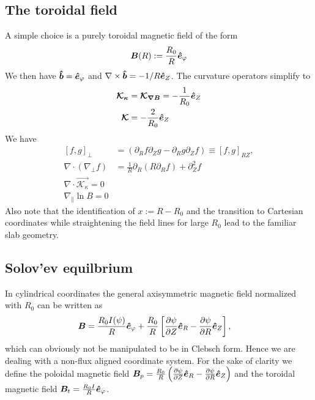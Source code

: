 \subsection{The toroidal field}\label{sec:toroidal}
A simple choice is a purely toroidal magnetic field of the form %
\begin{align}
  {\boldsymbol{B}}(R) := \frac{R_0}{R} \bm{\hat{e}}_\varphi
  \label{}
\end{align}
We then have $\bm{\hat{b}} = \bm{\hat{e}}_\varphi$ and $\nabla\times\bm{\hat{b}} = -1/R\bm{\hat{e}}_Z$. The curvature operators simplify to
\begin{align}
  {\boldsymbol{ \mathcal K_\kappa}} &= {\boldsymbol{ \mathcal K_{\nabla B}}} = -\frac{1}{R_0} \bm{\hat{e}}_Z \\
{\boldsymbol{ \mathcal K}} &= -\frac{2}{R_0}\bm{\hat{e}}_Z
  \label{}
\end{align}
We have
\begin{subequations}
\begin{align}
    [f, g]_\perp &= (\partial_R f\partial_Z g - \partial_R g\partial_Z f) \equiv [f, g]_{RZ}, \\
    \nabla \cdot(\nabla_\perp f) &= \frac{1}{R}\partial_R\left(R\partial_R f\right) + \partial_Z^2f \\
    \nabla\cdot\vec{\mathcal K_{\kappa}}= 0\\
    \nabla_\parallel \ln B = 0
    \label{}
\end{align}
\end{subequations}
Also note that the identification of $x:=R-R_0$ and the transition to
Cartesian coordinates while straightening the field lines for large $R_0$
lead to the familiar slab geometry.

\subsection{Solov'ev equilbrium}\label{sec:solovev}
In cylindrical coordinates the general axisymmetric magnetic field normalized with $R_0$ can be written as
\begin{align}
 {\boldsymbol{B}} &= \frac{R_0I(\psi)}{R} \bm{\hat{e}}_{\varphi} + \frac{R_0}{R}\left[\frac{\partial \psi}{\partial Z} \bm{\hat{e}}_R 
         -  \frac{\partial \psi}{\partial R} \bm{\hat{e}}_Z\right] ,
\end{align}
which can obviously not be manipulated to be in Clebsch form. Hence we are dealing with a non-flux aligned coordinate system.
For the sake of clarity we define the poloidal magnetic field \( {\boldsymbol{B}}_p = \frac{R_0}{R}\left( \frac{\partial \psi}{\partial Z}\bm{\hat{e}}_R - \frac{\partial \psi}{\partial R}\bm{\hat{e}}_Z\right)
\) and the toroidal magnetic field \({\boldsymbol{B}}_t =\frac{R_0I}{R} \bm{\hat{e}}_{\varphi}\).


